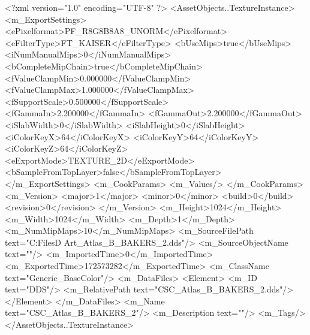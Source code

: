 <?xml version="1.0" encoding="UTF-8" ?>
<AssetObjects..TextureInstance>
	<m_ExportSettings>
		<ePixelformat>PF_R8G8B8A8_UNORM</ePixelformat>
		<eFilterType>FT_KAISER</eFilterType>
		<bUseMips>true</bUseMips>
		<iNumManualMips>0</iNumManualMips>
		<bCompleteMipChain>true</bCompleteMipChain>
		<fValueClampMin>0.000000</fValueClampMin>
		<fValueClampMax>1.000000</fValueClampMax>
		<fSupportScale>0.500000</fSupportScale>
		<fGammaIn>2.200000</fGammaIn>
		<fGammaOut>2.200000</fGammaOut>
		<iSlabWidth>0</iSlabWidth>
		<iSlabHeight>0</iSlabHeight>
		<iColorKeyX>64</iColorKeyX>
		<iColorKeyY>64</iColorKeyY>
		<iColorKeyZ>64</iColorKeyZ>
		<eExportMode>TEXTURE_2D</eExportMode>
		<bSampleFromTopLayer>false</bSampleFromTopLayer>
	</m_ExportSettings>
	<m_CookParams>
		<m_Values/>
	</m_CookParams>
	<m_Version>
		<major>1</major>
		<minor>0</minor>
		<build>0</build>
		<revision>0</revision>
	</m_Version>
	<m_Height>1024</m_Height>
	<m_Width>1024</m_Width>
	<m_Depth>1</m_Depth>
	<m_NumMipMaps>10</m_NumMipMaps>
	<m_SourceFilePath text="C:\Users\Shadow\Desktop\Working Files\3D Art\Textures\CSC_Atlas_B_BAKERS_2.dds"/>
	<m_SourceObjectName text=""/>
	<m_ImportedTime>0</m_ImportedTime>
	<m_ExportedTime>172573282</m_ExportedTime>
	<m_ClassName text="Generic_BaseColor"/>
	<m_DataFiles>
		<Element>
			<m_ID text="DDS"/>
			<m_RelativePath text="CSC_Atlas_B_BAKERS_2.dds"/>
		</Element>
	</m_DataFiles>
	<m_Name text="CSC_Atlas_B_BAKERS_2"/>
	<m_Description text=""/>
	<m_Tags/>
</AssetObjects..TextureInstance>

